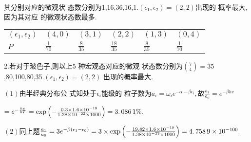 \documentclass{ctexart}
\begin{document}
其分别对应的微观状%
态数分别为1,16,36,16,1.$\left( \epsilon
_{1},\epsilon _{2}\right) =\left( 2,2\right) $出现的%
概率最大,因为其对应%
的微观状态数最多.

\begin{tabular}{llllll}
$\left( \epsilon _{1},\epsilon _{2}\right) $ & $\left( 4,0\right) $ & $%
\left( 3,1\right) $ & $\left( 2,2\right) $ & $\left( 1,3\right) $ & $\left(
0,4\right) $ \\ 
$P$ & $\frac{1}{70}$ & $\frac{8}{35}$ & $\frac{18}{35}$ & $\frac{8}{35}$ & $%
\frac{1}{70}$%
\end{tabular}

2.若对于玻色子,则以上5%
种宏观态对应的微观%
状态数分别为$\binom{7}{4}=\allowbreak 35$%
,80,100,80,35.$\left( \epsilon _{1},\epsilon _{2}\right) =\left( 2,2\right) $%
出现的概率最大.


$\left( 1\right) $由半经典分布公%
式知处于$\epsilon _{i}$能级的%
粒子数为$a_{i}=\omega _{i}e^{-\alpha -\beta \epsilon
_{i}},$故$\frac{a_{1}}{a_{0}}=e^{-\beta hv}$

$=e^{-\frac{hv}{kT}}=\exp \left( -\frac{0.3\times 1.6\times 10^{-19}}{%
1.38\times 10^{-23}\times 1000}\right) =\allowbreak 3.\,\allowbreak
086\,1\%. $


$\left( 2\right) $同上题$\frac{a_{1}}{a_{0}}=3e^{-\beta
\left( \epsilon _{1}-\epsilon _{0}\right) }=3\times \exp \left( -\frac{%
19.82\times 1.6\times 10^{-19}}{1.38\times 10^{-23}\times 1000}\right)
=\allowbreak 4.\,\allowbreak 758\,9\times 10^{-100}.$
\end{document}
